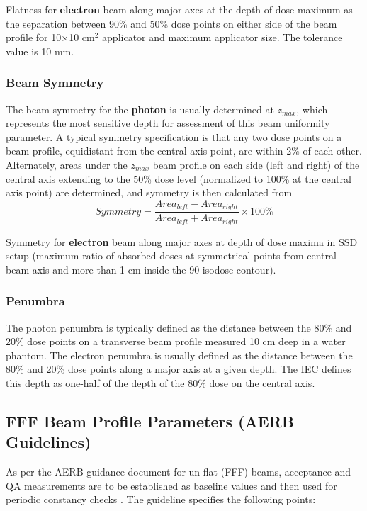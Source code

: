 Flatness for \textbf{electron} beam along major axes at the depth of dose maximum as the separation between
90\% and 50\% dose points on either side of the beam profile for 10$\times$10 cm$^2$ applicator and maximum applicator size.
The tolerance value is 10 mm.

\subsubsection{Beam Symmetry}
The beam symmetry for the \textbf{photon} is usually determined at $z_{max}$, which represents the most sensitive depth for assessment of this beam uniformity parameter. A typical symmetry specification is that any two dose points on a beam profile, equidistant from the central axis point, are within 2\% of each other. Alternately, areas under the $z_{max}$ beam profile on each side (left and right) of the central axis extending to the 50\% dose level (normalized to 100\% at the central axis point) are determined, and symmetry is then calculated from
\begin{equation}Symmetry = \frac{Area_{left} - Area_{right}}{Area_{left} + Area_{right}} \times 100\%\end{equation}

Symmetry for \textbf{electron} beam along major axes at depth of dose maxima in SSD setup (maximum ratio
of absorbed doses at symmetrical points from central beam axis and more than 1 cm inside the 90%
isodose contour).

\subsubsection{Penumbra}
The photon penumbra is typically defined as the distance between the 80\% and 20\% dose
points on a transverse beam profile measured 10 cm deep in a water phantom. The electron penumbra
is usually defined as the distance between the 80\% and 20\% dose points along a major axis at a given
depth. The IEC defines this depth as one-half of the depth of the 80\% dose on the central axis.

\subsection{FFF Beam Profile Parameters (AERB Guidelines)}
As per the AERB guidance document for un-flat (FFF) beams, acceptance and QA measurements are to be established as baseline values and then used for periodic constancy checks \cite{aerb_qa_radiotherapy}. The guideline specifies the following points:

